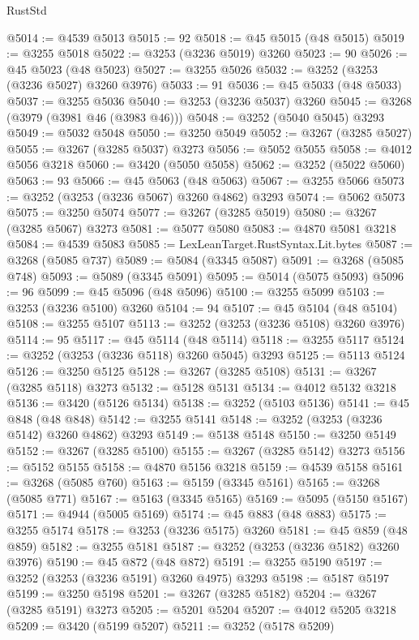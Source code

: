 \begin{lexlean}{RustStd}
\begin{coremodule}
@5014 := @4539 @5013
@5015 := 92
@5018 := @45 @5015 (@48 @5015)
@5019 := @3255 @5018
@5022 := @3253 (@3236 @5019) @3260
@5023 := 90
@5026 := @45 @5023 (@48 @5023)
@5027 := @3255 @5026
@5032 := @3252 (@3253 (@3236 @5027) @3260 @3976)
@5033 := 91
@5036 := @45 @5033 (@48 @5033)
@5037 := @3255 @5036
@5040 := @3253 (@3236 @5037) @3260
@5045 := @3268 (@3979 (@3981 @46 (@3983 @46)))
@5048 := @3252 (@5040 @5045) @3293
@5049 := @5032 @5048
@5050 := @3250 @5049
@5052 := @3267 (@3285 @5027)
@5055 := @3267 (@3285 @5037) @3273
@5056 := @5052 @5055
@5058 := @4012 @5056 @3218
@5060 := @3420 (@5050 @5058)
@5062 := @3252 (@5022 @5060)
@5063 := 93
@5066 := @45 @5063 (@48 @5063)
@5067 := @3255 @5066
@5073 := @3252 (@3253 (@3236 @5067) @3260 @4862) @3293
@5074 := @5062 @5073
@5075 := @3250 @5074
@5077 := @3267 (@3285 @5019)
@5080 := @3267 (@3285 @5067) @3273
@5081 := @5077 @5080
@5083 := @4870 @5081 @3218
@5084 := @4539 @5083
@5085 := LexLeanTarget.RustSyntax.Lit.bytes
@5087 := @3268 (@5085 @737)
@5089 := @5084 (@3345 @5087)
@5091 := @3268 (@5085 @748)
@5093 := @5089 (@3345 @5091)
@5095 := @5014 (@5075 @5093)
@5096 := 96
@5099 := @45 @5096 (@48 @5096)
@5100 := @3255 @5099
@5103 := @3253 (@3236 @5100) @3260
@5104 := 94
@5107 := @45 @5104 (@48 @5104)
@5108 := @3255 @5107
@5113 := @3252 (@3253 (@3236 @5108) @3260 @3976)
@5114 := 95
@5117 := @45 @5114 (@48 @5114)
@5118 := @3255 @5117
@5124 := @3252 (@3253 (@3236 @5118) @3260 @5045) @3293
@5125 := @5113 @5124
@5126 := @3250 @5125
@5128 := @3267 (@3285 @5108)
@5131 := @3267 (@3285 @5118) @3273
@5132 := @5128 @5131
@5134 := @4012 @5132 @3218
@5136 := @3420 (@5126 @5134)
@5138 := @3252 (@5103 @5136)
@5141 := @45 @848 (@48 @848)
@5142 := @3255 @5141
@5148 := @3252 (@3253 (@3236 @5142) @3260 @4862) @3293
@5149 := @5138 @5148
@5150 := @3250 @5149
@5152 := @3267 (@3285 @5100)
@5155 := @3267 (@3285 @5142) @3273
@5156 := @5152 @5155
@5158 := @4870 @5156 @3218
@5159 := @4539 @5158
@5161 := @3268 (@5085 @760)
@5163 := @5159 (@3345 @5161)
@5165 := @3268 (@5085 @771)
@5167 := @5163 (@3345 @5165)
@5169 := @5095 (@5150 @5167)
@5171 := @4944 (@5005 @5169)
@5174 := @45 @883 (@48 @883)
@5175 := @3255 @5174
@5178 := @3253 (@3236 @5175) @3260
@5181 := @45 @859 (@48 @859)
@5182 := @3255 @5181
@5187 := @3252 (@3253 (@3236 @5182) @3260 @3976)
@5190 := @45 @872 (@48 @872)
@5191 := @3255 @5190
@5197 := @3252 (@3253 (@3236 @5191) @3260 @4975) @3293
@5198 := @5187 @5197
@5199 := @3250 @5198
@5201 := @3267 (@3285 @5182)
@5204 := @3267 (@3285 @5191) @3273
@5205 := @5201 @5204
@5207 := @4012 @5205 @3218
@5209 := @3420 (@5199 @5207)
@5211 := @3252 (@5178 @5209)

\end{coremodule}
\end{lexlean}
